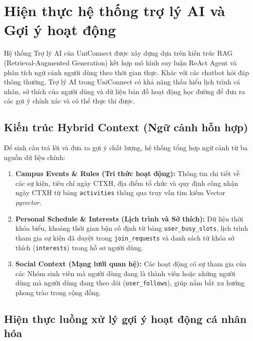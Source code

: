 \chapter{Hiện thực hệ thống trợ lý AI và Gợi ý hoạt động}

Hệ thống Trợ lý AI của UniConnect được xây dựng dựa trên kiến trúc RAG (Retrieval-Augmented Generation) kết hợp mô hình suy luận ReAct Agent và phân tích ngữ cảnh người dùng theo thời gian thực. Khác với các chatbot hỏi đáp thông thường, Trợ lý AI trong UniConnect có khả năng thấu hiểu lịch trình cá nhân, sở thích của người dùng và dữ liệu bản đồ hoạt động học đường để đưa ra các gợi ý chính xác và có thể thực thi được.

\section{Kiến trúc Hybrid Context (Ngữ cảnh hỗn hợp)}

Để sinh câu trả lời và đưa ra gợi ý chất lượng, hệ thống tổng hợp ngữ cảnh từ ba nguồn dữ liệu chính:
\begin{enumerate}
    \item \textbf{Campus Events \& Rules (Tri thức hoạt động):} Thông tin chi tiết về các sự kiện, tiêu chí ngày CTXH, địa điểm tổ chức và quy định công nhận ngày CTXH từ bảng \texttt{activities} thông qua truy vấn tìm kiếm Vector \textit{pgvector}.

    \item \textbf{Personal Schedule \& Interests (Lịch trình và Sở thích):} Dữ liệu thời khóa biểu, khoảng thời gian bận cố định từ bảng \texttt{user\_busy\_slots}, lịch trình tham gia sự kiện đã duyệt trong \texttt{join\_requests} và danh sách từ khóa sở thích (\texttt{interests}) trong hồ sơ người dùng.
    
    \item \textbf{Social Context (Mạng lưới quan hệ):} Các hoạt động có sự tham gia của các Nhóm sinh viên mà người dùng đang là thành viên hoặc những người dùng mà người dùng đang theo dõi (\texttt{user\_follows}), giúp nắm bắt xu hướng phong trào trong cộng đồng.
\end{enumerate}

\section{Hiện thực luồng xử lý gợi ý hoạt động cá nhân hóa}

